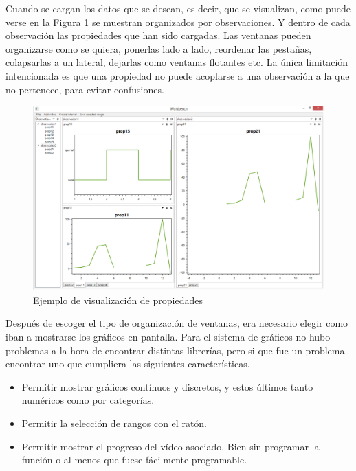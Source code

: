 Cuando se cargan los datos que se desean, es decir, que se visualizan, como puede verse en la
Figura \ref{fig:EjemploObservacion} se muestran organizados por observaciones. Y dentro de cada
observaci\'on las propiedades que han sido cargadas. Las ventanas pueden organizarse como se quiera, ponerlas lado a lado,
reordenar las pesta\~nas, colapsarlas a un lateral, dejarlas como ventanas flotantes etc. 
La \'unica limitaci\'on intencionada es que una propiedad no puede acoplarse a una observaci\'on a la que no pertenece,
para evitar confusiones.

\begin{figure}[h]
	\centering
	\includegraphics[width=0.9\linewidth]{./Figures/Capturas/EjemploObservacion.PNG}
	\caption{Ejemplo de visualizaci\'on de propiedades}
	\label{fig:EjemploObservacion}
\end{figure}

Despu\'es de escoger el tipo de organizaci\'on de ventanas, era necesario elegir como iban a mostrarse los gr\'aficos en pantalla.
Para el sistema de gr\'aficos no hubo problemas a la hora de encontrar distintas librer\'ias, pero si que fue un 
problema encontrar uno que cumpliera las siguientes caracter\'isticas.

\begin{itemize}
	\item Permitir mostrar gr\'{a}ficos cont\'{i}nuos y discretos, y estos \'{u}ltimos tanto num\'{e}ricos como por categor\'{i}as.
	\item Permitir la selecci\'{o}n de rangos con el rat\'{o}n.
	\item Permitir mostrar el progreso del v\'{i}deo asociado. Bien sin programar la funci\'{o}n o al menos que fuese f\'{a}cilmente programable.
\end{itemize}

